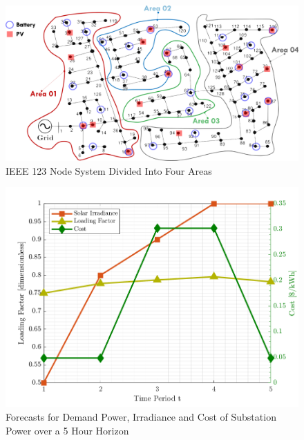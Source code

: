 \documentclass[../../outputs/main.tex]{subfiles}
\begin{document}
\begin{figure}[t]
    \centering
    \includegraphics[width=\linewidth]{../figures/ieee123-FourAreas-pv20-batt30.png}
    \caption{IEEE 123 Node System Divided Into Four Areas}
    \label{fig:ieee123-four-area-figure}
\end{figure}


\begin{figure}[t]
    \centering
    \includegraphics[height=0.25\textheight]{../figures/T5-inputCurves/InputCurves_Horizon_5.png}
    \caption{Forecasts for Demand Power, Irradiance and Cost of Substation Power over a 5 Hour Horizon}
    \label{fig:inputCurve-5}
\end{figure}

\def\ds{\rule{0pt}{1.5ex}} %
\end{document}
